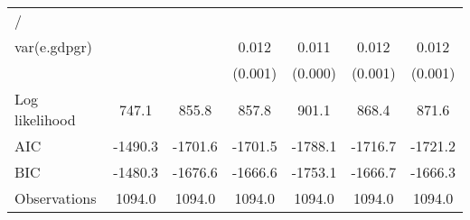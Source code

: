\begin{table}[htbp]
\begin{tabular}{l*{6}{c}}
\hline
/                   &                     &                     &                     &                     &                     &                     \\
var(e.gdpgr)        &                     &                     &       0.012\sym{***}&       0.011\sym{***}&       0.012\sym{***}&       0.012\sym{***}\\
                    &                     &                     &     (0.001)         &     (0.000)         &     (0.001)         &     (0.001)         \\
\hline
Log likelihood      &       747.1         &       855.8         &       857.8         &       901.1         &       868.4         &       871.6         \\
AIC                 &     -1490.3         &     -1701.6         &     -1701.5         &     -1788.1         &     -1716.7         &     -1721.2         \\
BIC                 &     -1480.3         &     -1676.6         &     -1666.6         &     -1753.1         &     -1666.7         &     -1666.3         \\
Observations        &      1094.0         &      1094.0         &      1094.0         &      1094.0         &      1094.0         &      1094.0         \\
\hline\hline
\end{tabular}
\end{table}
